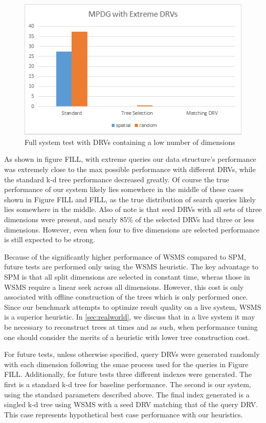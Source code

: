 \begin{figure}[h]
\begin{center}
\includegraphics[width=.85\textwidth]{Figures/fullsysext}
\end{center}
\caption{Full system test with DRVs containing a low number of dimensions}
\label{fig:fullsysext}
\end{figure}

As shown in figure FILL, with extreme queries our data structure's performance was extremely close to the max possible performance with different DRVs, while the standard k-d tree performance decreased greatly.  Of course the true performance of our system likely lies somewhere in the middle of these cases shown in Figure FILL and FILL, as the true distribution of search queries likely lies somewhere in the middle.  Also of note is that seed DRVs with all sets of three dimensions were present, and nearly 85\% of the selected DRVs had three or less dimensions.  However, even when four to five dimensions are selected performance is still expected to be strong.

Because of the significantly higher performance of WSMS compared to SPM, future tests are performed only using the WSMS heuristic.  The key advantage to SPM is that all split dimensions are selected in constant time, wheras those in WSMS require a linear seek across all dimensions.  However, this cost is only associated with offline construction of the trees which is only performed once.  Since our benchmark attempts to optimize result quality on a live system, WSMS is a superior heuristic.  In \ref{sec:realworld}, we discuss that in a live system it may be necessary to reconstruct trees at times and as such, when performance tuning one should consider the merits of a heuristic with lower tree construction cost.

For future tests, unless otherwise specified, query DRVs were generated randomly with each dimension following the smae process used for the queries in Figure FILL.  Additionally, for future tests three different indexes were generated.  The first is a standard k-d tree for baseline performance.  The second is our system, using the standard parameters described above.  The final index generated is a singled k-d tree using WSMS with a seed DRV matching that of the query DRV.  This case represents hypothetical best case performance with our heuristics.

